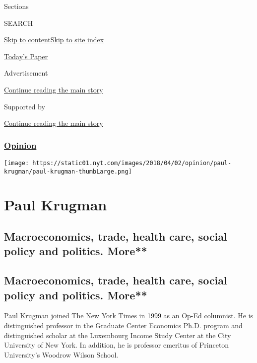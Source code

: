 Sections

SEARCH

\protect\hyperlink{site-content}{Skip to
content}\protect\hyperlink{site-index}{Skip to site index}

\href{https://myaccount.nytimes.com/auth/login?response_type=cookie\&client_id=vi}{}

\href{https://www.nytimes.com/section/todayspaper}{Today's Paper}

Advertisement

\protect\hyperlink{after-top}{Continue reading the main story}

Supported by

\protect\hyperlink{after-sponsor}{Continue reading the main story}

\hypertarget{opinion}{%
\subsubsection{\texorpdfstring{\href{/section/opinion}{Opinion}}{Opinion}}\label{opinion}}

\texttt{[image: https://static01.nyt.com/images/2018/04/02/opinion/paul-krugman/paul-krugman-thumbLarge.png]}

\hypertarget{paul-krugman}{%
\section{Paul Krugman}\label{paul-krugman}}

\hypertarget{macroeconomics-trade-health-care-social-policy-and-politics-more}{%
\subsection{Macroeconomics, trade, health care, social policy and
politics.
More**}\label{macroeconomics-trade-health-care-social-policy-and-politics-more}}

\hypertarget{macroeconomics-trade-health-care-social-policy-and-politics-more-1}{%
\subsection{Macroeconomics, trade, health care, social policy and
politics.
More**}\label{macroeconomics-trade-health-care-social-policy-and-politics-more-1}}

Paul Krugman joined The New York Times in 1999 as an Op-Ed columnist. He
is distinguished professor in the Graduate Center Economics Ph.D.
program and distinguished scholar at the Luxembourg Income Study Center
at the City University of New York. In addition, he is professor
emeritus of Princeton University's Woodrow Wilson School.

